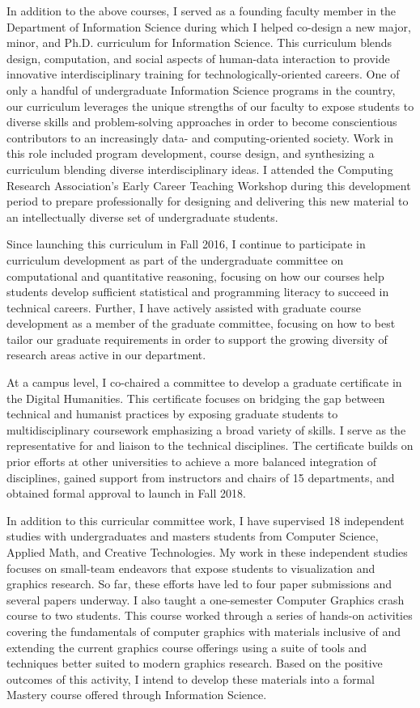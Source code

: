 \documentclass[11pt]{article}
\begin{document}
In addition to the above courses, I served as a founding faculty member in the Department of Information Science during which I helped co-design a new major, minor, and Ph.D. curriculum for Information Science. This curriculum blends design, computation, and social aspects of human-data interaction to provide innovative interdisciplinary training for technologically-oriented careers.  One of only a handful of undergraduate Information Science programs in the country, our curriculum leverages the unique strengths of our faculty to expose students to diverse skills and problem-solving approaches in order to become conscientious contributors to an increasingly data- and computing-oriented society. Work in this role included program development, course design, and synthesizing a curriculum blending diverse interdisciplinary ideas. I attended the Computing Research Association's Early Career Teaching Workshop during this development period to prepare professionally for designing and delivering this new material to an intellectually diverse set of undergraduate students. 

Since launching this curriculum in Fall 2016, I continue to participate in curriculum development as part of the undergraduate committee on computational and quantitative reasoning, focusing on how our courses help students develop sufficient statistical and programming literacy to succeed in technical careers. Further, I have actively assisted with graduate course development as a member of the graduate committee, focusing on how to best tailor our graduate requirements in order to support the growing diversity of research areas active in our department. 

At a campus level, I co-chaired a committee to develop a graduate certificate in the Digital Humanities. This certificate focuses on bridging the gap between technical and humanist practices by exposing graduate students to multidisciplinary coursework emphasizing a broad variety of skills. I serve as the representative for and liaison to the technical disciplines. The certificate builds on prior efforts at other universities to achieve a more balanced integration of disciplines, gained support from instructors and chairs of 15 departments, and obtained formal approval to launch in Fall 2018. 

In addition to this curricular committee work, I have supervised 18 independent studies with undergraduates and masters students from Computer Science, Applied Math, and Creative Technologies. My work in these independent studies focuses on small-team endeavors that expose students to visualization and graphics research. So far, these efforts have led to four paper submissions and several papers underway. I also taught a one-semester Computer Graphics crash course to two students. This course worked through a series of hands-on activities covering the fundamentals of computer graphics with materials inclusive of and extending the current graphics course offerings using a suite of tools and techniques better suited to modern graphics research. Based on the positive outcomes of this activity, I intend to develop these materials into a formal Mastery course offered through Information Science. 
\end{document}
